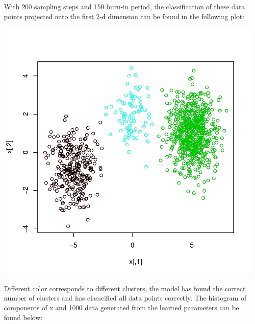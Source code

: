 \documentclass[a4paper]{article}
\begin{document}
With 200 sampling steps and 150 burn-in period, the classification of these data points projected onto the first 2-d dimension can be found in the following plot:
\begin{Schunk}
\end{Schunk}
\includegraphics{vignettes-chunk3}

Different color corresponds to different clusters, the model has found the correct number of clusters and has classcified all data points correctly. The histogram of components of x and 1000 data generated from the learned parameters can be found below:\\
\end{document}
